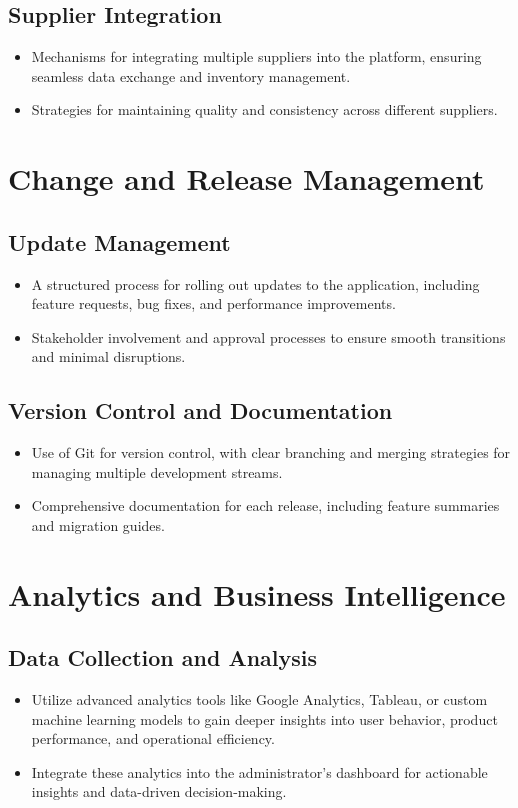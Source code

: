 \documentclass[11pt]{article}
\begin{document}
	\subsection*{Supplier Integration}
	\begin{itemize}
		\item Mechanisms for integrating multiple suppliers into the platform, ensuring seamless data exchange and inventory management.
		\item Strategies for maintaining quality and consistency across different suppliers.
	\end{itemize}
	
	\section*{Change and Release Management}
	
	\subsection*{Update Management}
	\begin{itemize}
		\item A structured process for rolling out updates to the application, including feature requests, bug fixes, and performance improvements.
		\item Stakeholder involvement and approval processes to ensure smooth transitions and minimal disruptions.
	\end{itemize}
	
	\subsection*{Version Control and Documentation}
	\begin{itemize}
		\item Use of Git for version control, with clear branching and merging strategies for managing multiple development streams.
		\item Comprehensive documentation for each release, including feature summaries and migration guides.
	\end{itemize}
	
	\section*{Analytics and Business Intelligence}
	
	\subsection*{Data Collection and Analysis}
	\begin{itemize}
		\item Utilize advanced analytics tools like Google Analytics, Tableau, or custom machine learning models to gain deeper insights into user behavior, product performance, and operational efficiency.
		\item Integrate these analytics into the administrator's dashboard for actionable insights and data-driven decision-making.
	\end{itemize}
	
\end{document}
